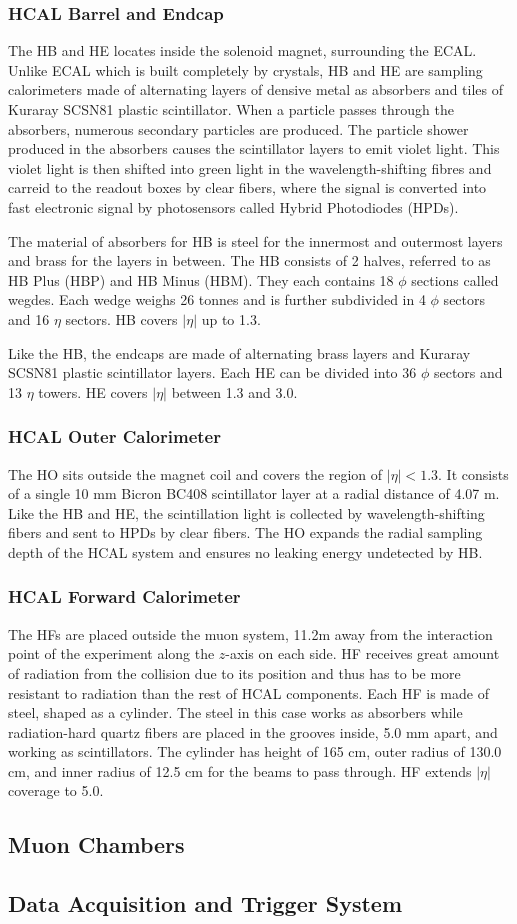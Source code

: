 \subsubsection{HCAL Barrel and Endcap}
The HB and HE locates inside the solenoid magnet, surrounding the ECAL. Unlike ECAL which is built completely by crystals, HB and HE are sampling calorimeters made of alternating layers of densive metal as absorbers and tiles of Kuraray SCSN81 plastic scintillator. When a particle passes through the absorbers, numerous secondary particles are produced. The particle shower produced in the absorbers causes the scintillator layers to emit violet light. This violet light is then shifted into green light in the wavelength-shifting fibres and carreid to the readout boxes by clear fibers, where the signal is converted into fast electronic signal by photosensors called Hybrid Photodiodes (HPDs).

\vspace{0.3cm}
The material of absorbers for HB is steel for the innermost and outermost layers and brass for the layers in between. The HB consists of 2 halves, referred to as HB Plus (HBP) and HB Minus (HBM). They each contains 18 $\phi$ sections called wegdes. Each wedge weighs 26 tonnes and is further subdivided in 4 $\phi$ sectors and 16 $\eta$ sectors. HB covers $|\eta|$ up to 1.3.

\vspace{0.3cm}
Like the HB, the endcaps are made of alternating brass layers and Kuraray SCSN81 plastic scintillator layers. Each HE can be divided into 36 $\phi$ sectors and 13 $\eta$ towers. HE covers $|\eta|$ between 1.3 and 3.0.

\subsubsection{HCAL Outer Calorimeter}
The HO sits outside the magnet coil and covers the region of $|\eta|<1.3$. It consists of a single 10 mm Bicron BC408 scintillator layer at a radial distance of 4.07 m. Like the HB and HE, the scintillation light is collected by wavelength-shifting fibers and sent to HPDs by clear fibers. The HO expands the radial sampling depth of the HCAL system and ensures no leaking energy undetected by HB.

\subsubsection{HCAL Forward Calorimeter}
The HFs are placed outside the muon system, 11.2m away from the interaction point of the experiment along the $z$-axis on each side. HF receives great amount of radiation from the collision due to its position and thus has to be more resistant to radiation than the rest of HCAL components. Each HF is made of steel, shaped as a cylinder. The steel in this case works as absorbers while radiation-hard quartz fibers are placed in the grooves inside, 5.0 mm apart, and working as scintillators. The cylinder has height of 165 cm, outer radius of 130.0 cm, and inner radius of 12.5 cm for the beams to pass through. HF extends $|\eta|$ coverage to 5.0.

\subsection{Muon Chambers} 
\subsection{Data Acquisition and Trigger System} 
